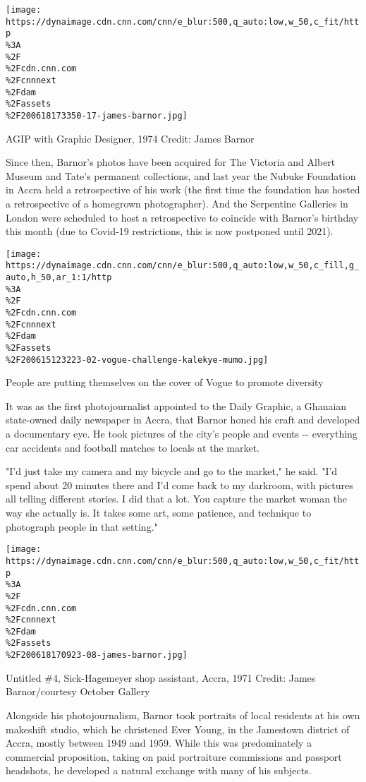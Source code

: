 \texttt{[image: https://dynaimage.cdn.cnn.com/cnn/e\_blur:500,q\_auto:low,w\_50,c\_fit/http\\\%3A\\\%2F\\\%2Fcdn.cnn.com\\\%2Fcnnnext\\\%2Fdam\\\%2Fassets\\\%2F200618173350-17-james-barnor.jpg]}

AGIP with Graphic Designer, 1974 Credit: James Barnor

Since then, Barnor's photos have been acquired for The Victoria and
Albert Museum and Tate's permanent collections, and last year the Nubuke
Foundation in Accra held a retrospective of his work (the first time the
foundation has hosted a retrospective of a homegrown photographer). And
the Serpentine Galleries in London were scheduled to host a
retrospective to coincide with Barnor's birthday this month (due to
Covid-19 restrictions, this is now postponed until 2021).

\href{/style/article/vogue-challenge-cover/index.html}{}

\texttt{[image: https://dynaimage.cdn.cnn.com/cnn/e\_blur:500,q\_auto:low,w\_50,c\_fill,g\_auto,h\_50,ar\_1:1/http\\\%3A\\\%2F\\\%2Fcdn.cnn.com\\\%2Fcnnnext\\\%2Fdam\\\%2Fassets\\\%2F200615123223-02-vogue-challenge-kalekye-mumo.jpg]}

People are putting themselves on the cover of Vogue to promote diversity

It was as the first photojournalist appointed to the Daily Graphic, a
Ghanaian state-owned daily newspaper in Accra, that Barnor honed his
craft and developed a documentary eye. He took pictures of the city's
people and events -\/- everything car accidents and football matches to
locals at the market.

"I'd just take my camera and my bicycle and go to the market," he said.
"I'd spend about 20 minutes there and I'd come back to my darkroom, with
pictures all telling different stories. I did that a lot. You capture
the market woman the way she actually is. It takes some art, some
patience, and technique to photograph people in that setting."

\texttt{[image: https://dynaimage.cdn.cnn.com/cnn/e\_blur:500,q\_auto:low,w\_50,c\_fit/http\\\%3A\\\%2F\\\%2Fcdn.cnn.com\\\%2Fcnnnext\\\%2Fdam\\\%2Fassets\\\%2F200618170923-08-james-barnor.jpg]}

Untitled \#4, Sick-Hagemeyer shop assistant, Accra, 1971 Credit: James
Barnor/courtesy October Gallery

Alongside his photojournalism, Barnor took portraits of local residents
at his own makeshift studio, which he christened Ever Young, in the
Jamestown district of Accra, mostly between 1949 and 1959. While this
was predominately a commercial proposition, taking on paid portraiture
commissions and passport headshots, he developed a natural exchange with
many of his subjects.


